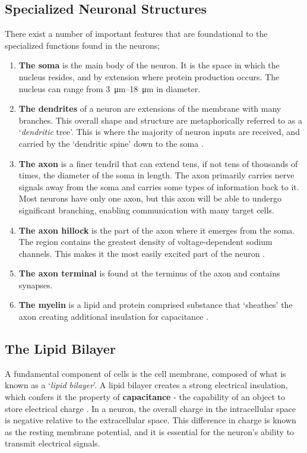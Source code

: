\documentclass[../../Orator]{subfiles}
\begin{document}
\subsection{Specialized Neuronal Structures}
There exist a number of important features that are foundational to the specialized functions found in the neurons;
\begin{enumerate}
    \item \textbf{The soma} is the main body of the neuron. It is the space in which the nucleus resides, and by extension where protein production occurs. The nucleus can range from \qtyrange{3}{18}{\um} in diameter.
    \item \textbf{The dendrites} of a neuron are extensions of the membrane with many branches. This overall shape and structure are metaphorically referred to as a `\textit{dendritic} tree'\footnotemark. This is where the majority of neuron inputs are received, and carried by the `dendritic spine' down to the soma \cite{}. 
    \item \textbf{The axon} is a finer tendril that can extend tens, if not tens of thousands of times, the diameter of the soma in length. The axon primarily carries nerve signals away from the soma and carries some types of information back to it. Most neurons have only one axon, but this axon will be able to undergo significant branching, enabling communication with many target cells. 
    \item \textbf{The axon hillock} is the part of the axon where it emerges from the soma. The region contains the greatest density of voltage-dependent sodium channels. This makes it the most easily excited part of the neuron \cite{}. 
    \item \textbf{The axon terminal} is found at the terminus of the axon and contains synapses. 
    \item \textbf{The myelin} is a lipid and protein comprised substance that `sheathes' the axon creating additional insulation for capacitance \cite{}.
\end{enumerate}


\subsection{The Lipid Bilayer} 
A fundamental component of cells is the cell membrane, composed of what is known as a `\textit{lipid bilayer}'\footnotemark. A lipid bilayer creates a strong electrical insulation, 
which confers it the property of \textbf{capacitance} - the capability of an object to store electrical charge \cite{}.  
In a neuron, the overall charge in the intracellular space is negative relative to the extracellular space. 
This difference in charge is known as the resting membrane potential, and it is essential for the neuron's ability to transmit electrical signals. 
\end{document}
